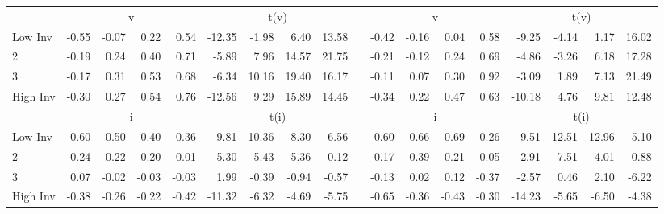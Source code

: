 \begin{table}[!ht]
\begin{tabular}{lrrrrrrrrlrrrrrrrr}
      & \multicolumn{4}{c}{v} & \multicolumn{4}{c}{t(v)}
      &
      & \multicolumn{4}{c}{v} & \multicolumn{4}{c}{t(v)}
    
    \\
      \cmidrule(r){2-5} \cmidrule(r){6-9} \cmidrule(r){11-14} \cmidrule(r){15-18}

    Low Inv   & -0.55  & -0.07  & 0.22  & 0.54  & -12.35  & -1.98  & 6.40  & 13.58 & & -0.42  & -0.16  & 0.04  & 0.58  & -9.25  & -4.14  & 1.17  & 16.02  \\
           2  & -0.19  & 0.24  & 0.40  & 0.71  & -5.89  & 7.96  & 14.57  & 21.75 & & -0.21  & -0.12  & 0.24  & 0.69  & -4.86  & -3.26  & 6.18  & 17.28  \\
           3  & -0.17  & 0.31  & 0.53  & 0.68  & -6.34  & 10.16  & 19.40  & 16.17 & & -0.11  & 0.07  & 0.30  & 0.92  & -3.09  & 1.89  & 7.13  & 21.49  \\
    High Inv  & -0.30  & 0.27  & 0.54  & 0.76  & -12.56  & 9.29  & 15.89  & 14.45 & & -0.34  & 0.22  & 0.47  & 0.63  & -10.18  & 4.76  & 9.81  & 12.48  \\
    
      & \multicolumn{4}{c}{i} & \multicolumn{4}{c}{t(i)}
      &
      & \multicolumn{4}{c}{i} & \multicolumn{4}{c}{t(i)}
    
    \\
      \cmidrule(r){2-5} \cmidrule(r){6-9} \cmidrule(r){11-14} \cmidrule(r){15-18}

    Low Inv   & 0.60  & 0.50  & 0.40  & 0.36  & 9.81  & 10.36  & 8.30  & 6.56 & & 0.60  & 0.66  & 0.69  & 0.26  & 9.51  & 12.51  & 12.96  & 5.10  \\
           2  & 0.24  & 0.22  & 0.20  & 0.01  & 5.30  & 5.43  & 5.36  & 0.12 & & 0.17  & 0.39  & 0.21  & -0.05  & 2.91  & 7.51  & 4.01  & -0.88  \\
           3  & 0.07  & -0.02  & -0.03  & -0.03  & 1.99  & -0.39  & -0.94  & -0.57 & & -0.13  & 0.02  & 0.12  & -0.37  & -2.57  & 0.46  & 2.10  & -6.22  \\
    High Inv  & -0.38  & -0.26  & -0.22  & -0.42  & -11.32  & -6.32  & -4.69  & -5.75 & & -0.65  & -0.36  & -0.43  & -0.30  & -14.23  & -5.65  & -6.50  & -4.38  \\
  

  \bottomrule
\end{tabular}
\label{tbl:32_Size_BM_Inv}
\end{table}
